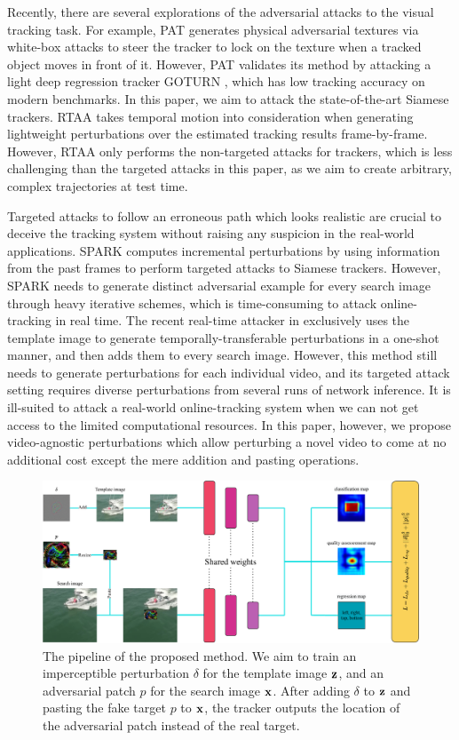 \documentclass{article}
\begin{document}
Recently, there are several explorations of the adversarial attacks to the visual tracking task. For example, PAT \cite{PAT} generates physical adversarial textures via white-box attacks to steer the tracker to lock on the texture when a tracked object moves in front of it. However, PAT validates its method by attacking a light deep regression tracker GOTURN \cite{GOTURN}, which has low tracking accuracy on modern benchmarks. In this paper, we aim to attack the state-of-the-art Siamese trackers.
RTAA \cite{RTAA} takes temporal motion into consideration when generating lightweight perturbations over the estimated tracking results frame-by-frame. However, RTAA only performs the non-targeted attacks for trackers, which is less challenging than the targeted attacks in this paper, as we aim to create arbitrary, complex trajectories at test time. 

Targeted attacks to follow an erroneous path which looks realistic are crucial to deceive the tracking system without raising any suspicion in the real-world applications.
SPARK \cite{SPARK} computes incremental perturbations by using information from the past frames to perform targeted attacks to Siamese trackers. However, SPARK needs to generate distinct adversarial example for every search image through heavy iterative schemes, which is time-consuming to attack online-tracking in real time. The recent real-time attacker in \cite{TemporallyTransferablePerturbations} exclusively uses the template image to generate temporally-transferable perturbations in a one-shot manner, and then adds them to every search image. However, this method still needs to generate perturbations for each individual video, and its targeted attack setting requires diverse perturbations from several runs of network inference. It is ill-suited to attack a real-world online-tracking system when we can not get access to the limited computational resources. In this paper, however, we propose video-agnostic perturbations which allow perturbing a novel video to come at no additional cost except the mere addition and pasting operations.

\begin{figure}[t]
\centering
\includegraphics[width=1.0\textwidth]{images/network_v2.pdf}
\caption{The pipeline of the proposed method. We aim to train an imperceptible perturbation $\delta$ for the template image $\textbf z$, and an adversarial patch $p$ for the search image $\textbf x$. After adding $\delta$ to $\textbf z$ and pasting the fake target $p$ to $\textbf x$, the tracker outputs the location of the adversarial patch instead of the real target.}
\end{figure}
\end{document}
